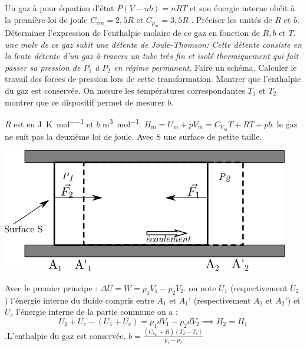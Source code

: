 \begin{Exercise}[title=Détente de Joule-Thomson]
		Un gaz à pour équation d'état $P(V-nb)=nRT$ et son énergie interne obéit à la première loi de joule $C_{vm} = 2,5R$ et $C_{p_m}=3,5 R$ .
		\Question
		\subQuestion Préciser les unités de $R$ et $b$.
		\subQuestion Déterminer l'expression de l'enthalpie molaire de ce gaz en fonction de $R,b$ et $T$.
		\emph{une mole de ce gaz subit une détente de Joule-Thomson: Cette détente consiste en la lente détente d'un gaz à travers un tube très fin et isolé thermiquement qui fait passer sa pression de $P_1$ à $P_2$ en régime permanent.}
		\Question
		\subQuestion Faire un schéma.
		\subQuestion Calculer le travail des forces de pression lors de cette transformation.
		\subQuestion Montrer que l'enthalpie du gaz est conservée.
		\subQuestion On mesure les températures correspondantes $T_1$ et $T_2$ montrer que ce dispositif permet de mesurer $b$.
\end{Exercise}
\begin{Answer}
		\Question
		\subQuestion $R$ est en \si{\J\per\K\per\mole} et $b$ \si{\m^3\per\mole}.
		\subQuestion $H_m = U_m + pV_m = C_{V_m} T + RT  + pb$. le gaz ne suit pas la deuxième loi de joule.
		\Question
		\subQuestion Avec S une surface de petite taille.
		\begin{center}
			\includegraphics[width = 0.5\linewidth]{../fig/joule-thomson.png}
		\end{center}
		\subQuestion Avec  le premier principe : $\Delta U = W = p_1 V_1 - p_2 V_2$.  on note $U_1$ (respectivement $U_2$) l'énergie interne du fluide  compris entre $A_1$ et $A_1'$ (respectivement $A_2$ et $A_2'$) et $U_c$ l'énergie interne de la partie commune on a :
		\[ U_2+U_c -(U_1+U_c) = p_1dV_1 -p_2dV_2 \implies H_2=H_1\] .L'enthalpie du gaz est conservée.
		\subQuestion $b=\frac{(C_{v_m}+R)(T_2-T_1)}{p_1-p_2}$
\end{Answer}
